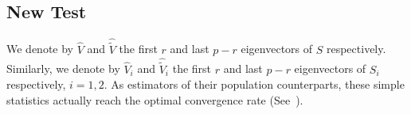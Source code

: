 


\subsection{New Test}
We denote by $\hat{V}$ and $\hat{\tilde{V}}$ the first $r$ and last $p-r$ eigenvectors of $S$ respectively.
Similarly, we denote by  $\hat{V}_i$ and $\hat{\tilde{V}}_i$ the first $r$ and last $p-r$ eigenvectors of $S_i$ respectively, $i=1,2$.
 As estimators of their population counterparts, these simple statistics actually reach the optimal convergence rate (See~\cite{Cai2012Sparse}).

